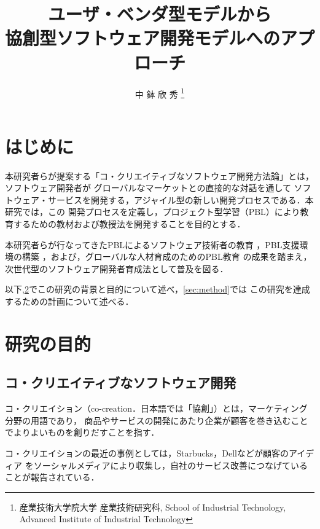 \documentclass[a4j,9pt,twoside,twocolumn]{jsarticle}
\title{ユーザ・ベンダ型モデルから\\協創型ソフトウェア開発モデルへのアプローチ}
\author{
中 鉢 欣 秀
\thanks{産業技術大学院大学 産業技術研究科, School of Industrial Technology, Advanced Institute of Industrial Technology}
}
\begin{document}
\pagestyle{empty}
\maketitle\thispagestyle{empty} %
\makereceivedon %

\section{はじめに}

	本研究者らが提案する「コ・クリエイティブなソフトウェア開発方法論」とは，ソフトウェア開発者が
	グローバルなマーケットとの直接的な対話を通して
	ソフトウェア・サービスを開発する，アジャイル型の新しい開発プロセスである．本研究では，この
	開発プロセスを定義し，プロジェクト型学習（PBL）により教育するための教材および教授法を開発することを目的とする．
	
	本研究者らが行なってきたPBLによるソフトウェア技術者の教育
	\cite{pub:tozawa-pbl-2009}
	\cite{pub:matsuzawa-2008}
	，PBL支援環境の構築
	\cite{pub:chubachi-ipbl-2012}
	\cite{pub:chubachi-ipbl-2011}
	\cite{pub:chubachi-ipbl-2009b}
	\cite{pub:chubachi-ipbl-2009a}
	，および，グローバルな人材育成のためのPBL教育
	\cite{pub:chubachi-global-2010}
	\cite{pub:nishino-2010}
	の成果を踏まえ，
	次世代型のソフトウェア開発者育成法として普及を図る．
	
	以下,\ref{sec:purpose}でこの研究の背景と目的について述べ，\ref{sec:method}では
	この研究を達成するための計画について述べる．
	
\section{研究の目的}\label{sec:purpose}
\subsection{コ・クリエイティブなソフトウェア開発}

    コ・クリエイション（co-creation．日本語では「協創」）とは，マーケティング分野の用語であり，
    商品やサービスの開発にあたり企業が顧客を巻き込むことでよりよいものを創りだすことを指す．
    
    コ・クリエイションの最近の事例としては，Starbucks，Dellなどが顧客のアイディア
    をソーシャルメディアにより収集し，自社のサービス改善につなげていることが報告されている\cite{wired}．
\end{document}
